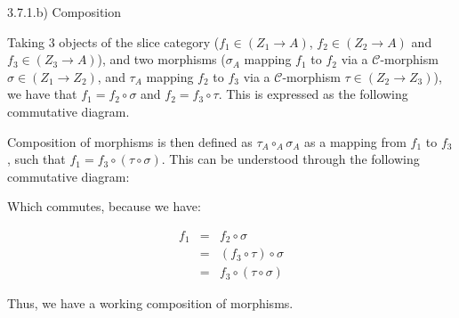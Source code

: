 \documentclass[12pt, letterpaper, twoside]{report}
\begin{document}
3.7.1.b) Composition

Taking 3 objects of the slice category ($f_1 \in (Z_1 \to A)$, $f_2 \in (Z_2 \to A)$ and $f_3 \in (Z_3 \to A)$), and two morphisms ($\sigma_A$ mapping $f_1$ to $f_2$ via a $\mathcal{C}$-morphism $\sigma \in (Z_1 \to Z_2)$, and $\tau_A$ mapping $f_2$ to $f_3$ via a $\mathcal{C}$-morphism $\tau \in (Z_2 \to Z_3)$), we have that $f_1 = f_2 \circ \sigma$ and $f_2 = f_3 \circ \tau$. This is expressed as the following commutative diagram.


Composition of morphisms is then defined as $\tau_A \circ_A \sigma_A$ as a mapping from $f_1$ to $f_3$, such that $f_1 = f_3 \circ (\tau \circ \sigma)$. This can be understood through the following commutative diagram:


Which commutes, because we have:

$$
\begin{aligned}
	f_1 &=&  f_2              \circ \sigma  \\
		&=& (f_3 \circ  \tau) \circ \sigma  \\
		&=&  f_3 \circ (\tau  \circ \sigma)
\end{aligned}
$$

Thus, we have a working composition of morphisms.
\end{document}

